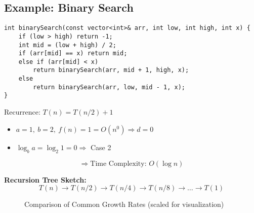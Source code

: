 \documentclass{article}
\begin{document}
\subsection*{Example: Binary Search}
\begin{lstlisting}[style=cppstyle]
int binarySearch(const vector<int>& arr, int low, int high, int x) {
    if (low > high) return -1;
    int mid = (low + high) / 2;
    if (arr[mid] == x) return mid;
    else if (arr[mid] < x)
        return binarySearch(arr, mid + 1, high, x);
    else
        return binarySearch(arr, low, mid - 1, x);
}
\end{lstlisting}

Recurrence: $T(n) = T(n/2) + 1$

\begin{itemize}
    \item $a = 1,\ b = 2,\ f(n) = 1 = O(n^0) \Rightarrow d = 0$
    \item $\log_b a = \log_2 1 = 0 \Rightarrow$ Case 2
\end{itemize}

\[
\Rightarrow \text{Time Complexity: } O(\log n)
\]

\textbf{Recursion Tree Sketch:}
\[
T(n) \rightarrow T(n/2) \rightarrow T(n/4) \rightarrow T(n/8) \rightarrow \dots \rightarrow T(1)
\]



\begin{figure}[h!]
\centering
{}
\caption{Comparison of Common Growth Rates (scaled for visualization)}
\end{figure}
\end{document}
